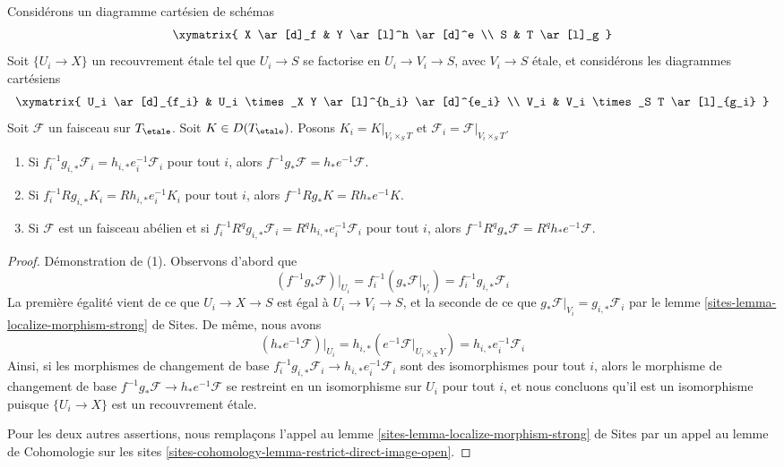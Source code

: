 \begin{lemma}
\label{lemma-base-change-local}
Considérons un diagramme cartésien de schémas
$$
\xymatrix{
X \ar[d]_f & Y \ar[l]^h \ar[d]^e \\
S & T \ar[l]_g
}
$$
Soit $\{U_i \to X\}$ un recouvrement étale tel que $U_i \to S$
se factorise en $U_i \to V_i \to S$, avec $V_i \to S$ étale,
et considérons les diagrammes cartésiens
$$
\xymatrix{
U_i \ar[d]_{f_i} & U_i \times_X Y \ar[l]^{h_i} \ar[d]^{e_i} \\
V_i & V_i \times_S T \ar[l]_{g_i}
}
$$
Soit $\mathcal{F}$ un faisceau sur $T_\etale$. Soit $K \in D(T_\etale)$.
Posons $K_i = K|_{V_i \times_S T}$ et
$\mathcal{F}_i = \mathcal{F}|_{V_i \times_S T}$.
\begin{enumerate}
\item Si $f_i^{-1}g_{i, *}\mathcal{F}_i = h_{i, *}e_i^{-1}\mathcal{F}_i$
pour tout $i$, alors $f^{-1}g_*\mathcal{F} = h_*e^{-1}\mathcal{F}$.
\item Si $f_i^{-1}Rg_{i, *}K_i = Rh_{i, *}e_i^{-1}K_i$
pour tout $i$, alors $f^{-1}Rg_*K = Rh_*e^{-1}K$.
\item Si $\mathcal{F}$ est un faisceau abélien et si
$f_i^{-1}R^qg_{i, *}\mathcal{F}_i = R^qh_{i, *}e_i^{-1}\mathcal{F}_i$
pour tout $i$, alors
$f^{-1}R^qg_*\mathcal{F} = R^qh_*e^{-1}\mathcal{F}$.
\end{enumerate}
\end{lemma}

\begin{proof}
Démonstration de (1). Observons d'abord que
$$
(f^{-1}g_*\mathcal{F})|_{U_i} =
f_i^{-1}(g_*\mathcal{F}|_{V_i}) =
f_i^{-1}g_{i, *}\mathcal{F}_i
$$
La première égalité vient de ce que $U_i \to X \to S$ est égal à
$U_i \to V_i \to S$, et la seconde de ce que
$g_*\mathcal{F}|_{V_i} = g_{i, *}\mathcal{F}_i$ par le
lemme \ref{sites-lemma-localize-morphism-strong} de Sites.
De même, nous avons
$$
(h_*e^{-1}\mathcal{F})|_{U_i} =
h_{i, *}(e^{-1}\mathcal{F}|_{U_i \times_X Y}) =
h_{i, *}e_i^{-1}\mathcal{F}_i
$$
Ainsi, si les morphismes de changement de base
$f_i^{-1}g_{i, *}\mathcal{F}_i \to h_{i, *}e_i^{-1}\mathcal{F}_i$
sont des isomorphismes pour tout $i$, alors le morphisme de changement de base
$f^{-1}g_*\mathcal{F} \to h_*e^{-1}\mathcal{F}$
se restreint en un isomorphisme sur $U_i$ pour tout $i$,
et nous concluons qu'il est un isomorphisme puisque $\{U_i \to X\}$
est un recouvrement étale.

\medskip\noindent
Pour les deux autres assertions, nous remplaçons l'appel au
lemme \ref{sites-lemma-localize-morphism-strong} de Sites
par un appel au
lemme de Cohomologie sur les sites
\ref{sites-cohomology-lemma-restrict-direct-image-open}.
\end{proof}

